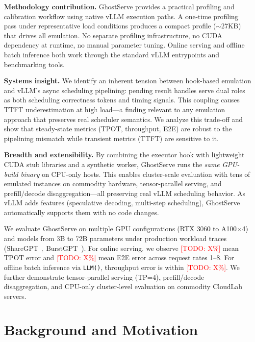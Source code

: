 \documentclass[conference]{IEEEtran}
\newcommand{\sysname}{GhostServe}
\newcommand{\todo}[1]{\textcolor{red}{[TODO: #1]}}
\begin{document}
\textbf{Methodology contribution.} \sysname{} provides a practical profiling and calibration workflow using native vLLM execution paths. A one-time profiling pass under representative load conditions produces a compact profile ($\sim$27KB) that drives all emulation. No separate profiling infrastructure, no CUDA dependency at runtime, no manual parameter tuning. Online serving and offline batch inference both work through the standard vLLM entrypoints and benchmarking tools.

\textbf{Systems insight.} We identify an inherent tension between hook-based emulation and vLLM's async scheduling pipelining: pending result handles serve dual roles as both scheduling correctness tokens and timing signals. This coupling causes TTFT underestimation at high load---a finding relevant to any emulation approach that preserves real scheduler semantics. We analyze this trade-off and show that steady-state metrics (TPOT, throughput, E2E) are robust to the pipelining mismatch while transient metrics (TTFT) are sensitive to it.

\textbf{Breadth and extensibility.} By combining the executor hook with lightweight CUDA stub libraries and a synthetic worker, \sysname{} runs the \emph{same GPU-build binary} on CPU-only hosts. This enables cluster-scale evaluation with tens of emulated instances on commodity hardware, tensor-parallel serving, and prefill/decode disaggregation---all preserving real vLLM scheduling behavior. As vLLM adds features (speculative decoding, multi-step scheduling), \sysname{} automatically supports them with no code changes.

We evaluate \sysname{} on multiple GPU configurations (RTX 3060 to A100$\times$4) and models from 3B to 72B parameters under production workload traces (ShareGPT~\cite{sharegpt2023}, BurstGPT~\cite{wang2024burstgpt}). For online serving, we observe \todo{X\%} mean TPOT error and \todo{X\%} mean E2E error across request rates 1--8. For offline batch inference via \texttt{LLM()}, throughput error is within \todo{X\%}. We further demonstrate tensor-parallel serving (TP=4), prefill/decode disaggregation, and CPU-only cluster-level evaluation on commodity CloudLab servers.

\section{Background and Motivation}
\end{document}
